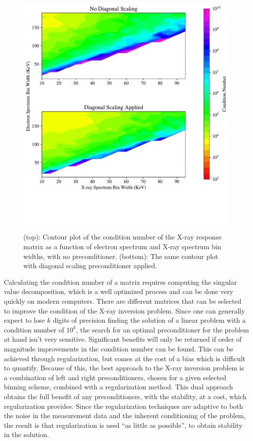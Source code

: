 \begin{figure}[p]
    \centering
    \includegraphics[width=\textwidth]{figures/chapter_4/condition_number_binning_diagonal_scaling/condition_number_binning_diagonal_scaling.pdf}
    \caption{(top): Contour plot of the condition number of the X-ray response matrix as a function of electron spectrum and X-ray spectrum bin widths, with no preconditioner. (bottom): The same contour plot with diagonal scaling preconditioner applied.}
    \label{matrix_spectral_plot_diagonal_scaling}
\end{figure}

Calculating the condition number of a matrix requires computing the singular value decomposition, which is a well optimized process and can be done very quickly on modern computers. There are different matrices that can be selected to improve the condition of the X-ray inversion problem. Since one can generally expect to lose $k$ digits of precision finding the solution of a linear problem with a condition number of $10^k$, the search for an optimal preconditioner for the problem at hand isn't very sensitive. Significant benefits will only be returned if order of magnitude improvements in the condition number can be found. This can be achieved through regularization, but comes at the cost of a bias which is difficult to quantify. Because of this, the best approach to the X-ray inversion problem is a combination of left and right preconditioners, chosen for a given selected binning scheme, combined with a regularization method. This dual approach obtains the full benefit of any preconditioners, with the stability, at a cost, which regularization provides. Since the regularization techniques are adaptive to both the noise in the measurement data and the inherent conditioning of the problem, the result is that regularization is used ``as little as possible'', to obtain stability in the solution. 

